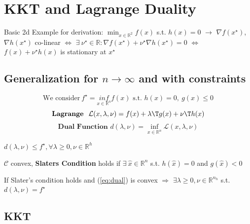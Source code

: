 \section{KKT and Lagrange Duality}

Basic 2d Example for derivation:
$\min _{x \in \mathbb{R}^2} f(x)$ s.t. $h(x)=0$
$\rightarrow$
$\nabla f(x^\star)$, $\nabla h(x^\star)$
co-linear
$\Leftrightarrow$
$\exists\ \nu^\star \in \mathbb{R}: \nabla f(x^\star)+\nu^\star\nabla h(x^\star) = 0$
$\Leftrightarrow$
$f(x)+\nu^\star h(x)$ is stationary at $x^\star$

\subsection{Generalization for $n\rightarrow\infty$ and with constraints}
\begin{equation}
	\text{We consider}\
	f^\star = \underset{x \in \mathcal{\mathbb{R}}^n}{inf}f(x) \text{ s.t. } h(x)=0,\ g(x) \le 0
	\label{eq:dual}
\end{equation}
$$
	\textbf{Lagrange }\
	\mathcal{L}(x,\lambda,\nu) = f(x) + \lambda\T g(x)+\nu\T h(x)
$$ $$
	\textbf{Dual Function }
	d(\lambda,\nu) = \inf_{x \in \mathcal{\mathbb{R}}^n}\mathcal{L}(x,\lambda,\nu)
$$
\begin{proposition}
	$d(\lambda,\nu)\le f^\star,\forall\lambda\ge0,\nu\in\mathbb{R}^{h}$
\end{proposition}

\begin{definition}
	$\mathcal{C}$ convex, \textbf{Slaters Condition} holds if
	$\exists\ \hat{x} \in \mathbb{R}^{n}$ s.t. $h(\hat{x})=0$ and $g(\hat{x})<0$
\end{definition}

\begin{proposition}
	If Slater's condition holds
	and (\ref{eq:dual}) is convex
	$\Rightarrow$
	$\exists \lambda \ge 0, \nu \in \mathbb{R}^{n_h}$ s.t. $d(\lambda,\nu)=f^\star$
\end{proposition}

\subsection{KKT} %

